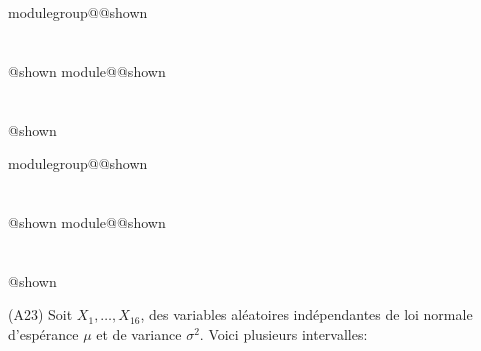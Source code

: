 \documentclass{Evaluation}
\makeatletter
\newcommand{\currentmodulekey}{}
\newcommand{\currentmoduletitle}{}
\newcommand{\currentgroupkey}{}
\newcommand{\currentgrouptitle}{}
\newcommand{\showmoduleifneeded}{%
  \ifx\currentgroupkey\empty\else
    \expandafter\ifx\csname modulegroup@\currentgroupkey @shown\endcsname\relax
      \section*{\currentgrouptitle}%
      \expandafter\gdef\csname modulegroup@\currentgroupkey @shown\endcsname{1}%
    \fi
  \fi
  \expandafter\ifx\csname module@\currentmodulekey @shown\endcsname\relax
    \section*{\currentmoduletitle}%
    \expandafter\gdef\csname module@\currentmodulekey @shown\endcsname{1}%
  \fi
}
\newenvironment{A23}{\showmoduleifneeded}{}
\makeatother
\begin{document}
\begin{questions}
\begin{A23}
\medskip

\end{A23}

\begin{A23}
\question
(A23) Soit $X_1,\hdots, X_{16}$, des variables aléatoires indépendantes de loi normale d'espérance $\mu$ et de variance $\sigma^2$. Voici plusieurs intervalles:
\begin{center}
    

\end{center}
\end{A23}
\end{questions}
\end{document}
